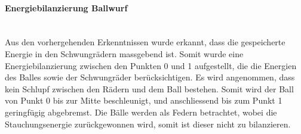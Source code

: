 \paragraph{Energiebilanzierung Ballwurf}$~~$\vspace{2mm}\\
Aus den vorhergehenden Erkenntnissen wurde erkannt, dass die gespeicherte Energie 
in den Schwungrädern massgebend ist. Somit wurde eine Energiebilanzierung zwischen 
den Punkten 0 und 1 aufgestellt, die die Energien des Balles sowie der Schwungräder 
berücksichtigen. Es wird angenommen, dass kein Schlupf zwischen den Rädern und dem 
Ball bestehen. Somit wird der Ball von Punkt 0 bis zur Mitte beschleunigt, und 
anschliessend bis zum Punkt 1 geringfügig abgebremst. Die Bälle werden als Federn 
betrachtet, wobei die Stauchungsenergie zurückgewonnen wird, somit ist dieser nicht 
zu bilanzieren.
%
